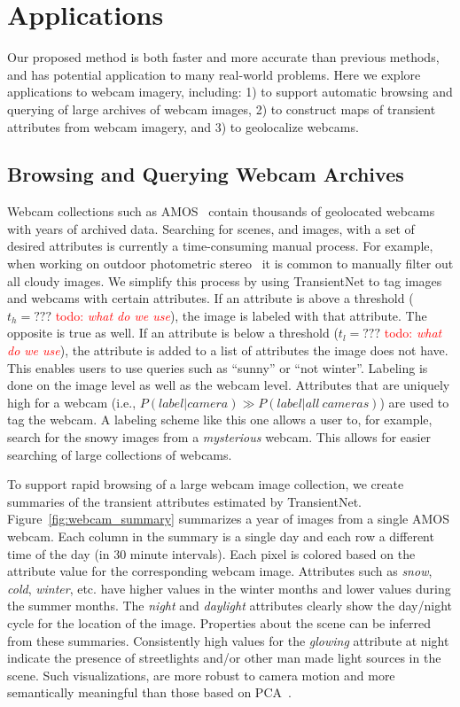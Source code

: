 \documentclass[10pt,twocolumn,letterpaper]{article}
\newcommand{\todo}[1]{\textcolor{red}{todo: {\em #1}}}
\newcommand{\figref}[1]{Figure~\ref{fig:#1}}
\begin{document}
\section{Applications}

Our proposed method is both faster and more accurate than previous
methods, and has potential application to many real-world problems.
Here we explore applications to webcam imagery,
including: 1) to support automatic browsing and querying of large
archives of webcam images, 2) to construct maps of transient
attributes from webcam imagery, and 3) to geolocalize webcams.

\subsection{Browsing and Querying Webcam Archives}

Webcam collections such as AMOS~\cite{jacobs07amos} contain thousands
of geolocated webcams with years of archived data.  Searching for
scenes, and images, with a set of desired attributes is currently a
time-consuming manual process. For example, when working on outdoor
photometric stereo~\cite{abramsheliometric} it is common to manually
filter out all cloudy images. We simplify this process by using
TransientNet to tag images and webcams with certain attributes.  If an
attribute is above a threshold ($t_h = ???$ \todo{what do we use}),
the image is labeled with that attribute.  The opposite is true as
well. If an attribute is below a threshold ($t_l = ???$ \todo{what do
we use}), the attribute is added to a list of attributes the image
does not have. This enables users to use queries such as ``sunny'' or
``not winter''. Labeling is done on the image level as well as the
webcam level. Attributes that are uniquely high for a webcam (i.e.,
$P(label|camera)\gg P(label|all\ cameras)$) are used to tag the
webcam. A labeling scheme like this one allows a user to, for example,
search for the snowy images from a \textit{mysterious} webcam. This
allows for easier searching of large collections of webcams.

To support rapid browsing of a large webcam image collection, we create
summaries of the transient attributes estimated by TransientNet.
\figref{webcam_summary} summarizes a year of images from a single AMOS webcam.
Each column in the summary is a single day and each row a different time of the
day (in 30 minute intervals).  Each pixel is colored based on the attribute
value for the corresponding webcam image. Attributes such as \textit{snow},
\textit{cold}, \textit{winter}, etc. have higher values in the winter months
and lower values during the summer months. The \textit{night} and
\textit{daylight} attributes clearly show the day/night cycle for the location
of the image. Properties about the scene can be inferred from these summaries.
Consistently high values for the \textit{glowing} attribute at night indicate
the presence of streetlights and/or other man made light sources in the scene.
Such visualizations, are more robust to camera motion and more semantically
meaningful than those based on PCA~\cite{jacobs09webcamdata}.
\end{document}
